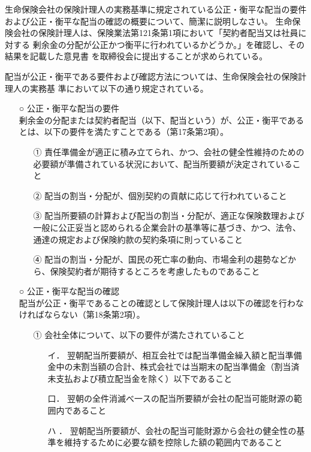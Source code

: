 \documentclass[report,gutter=10mm,fore-edge=10mm,uplatex,dvipdfmx]{jlreq}
\begin{document}
生命保険会社の保険計理人の実務基準に規定されている公正・衡平な配当の要件および公正・衡平な配当の確認の概要について、簡潔に説明しなさい。
\answer{}
生命保険会社の保険計理人は、保険業法第121条第1項において「契約者配当又は社員に対する
剰余金の分配が公正かつ衡平に行われているかどうか。」を確認し、その結果を記載した意見書
を取締役会に提出することが求められている。

配当が公正・衡平である要件および確認方法については、生命保険会社の保険計理人の実務基
準において以下の通り規定されている。

\begin{itemize}
\item[○] 公正・衡平な配当の要件\\
剰余金の分配または契約者配当（以下、配当という）が、公正・衡平であるとは、以下の要件を満たすことである（第17条第2項）。
\begin{itemize}
\item[①] 責任準備金が適正に積み立てられ、かつ、会社の健全性維持のための必要額が準備されている状況において、配当所要額が決定されていること
\item[②] 配当の割当・分配が、個別契約の貢献に応じて行われていること
\item[③] 配当所要額の計算および配当の割当・分配が、適正な保険数理および一般に公正妥当と認められる企業会計の基準等に基づき、かつ、法令、通達の規定および保険約款の契約条項に則っていること
\item[④] 配当の割当・分配が、国民の死亡率の動向、市場金利の趨勢などから、保険契約者が期待するところを考慮したものであること
\end{itemize}
\item[○] 公正・衡平な配当の確認\\
配当が公正・衡平であることの確認として保険計理人は以下の確認を行わなければならない（第18条第2項）。
\begin{itemize}
\item[①] 会社全体について、以下の要件が満たされていること
\begin{itemize}
\item[イ．] 翌朝配当所要額が、相互会社では配当準備金繰入額と配当準備金中の未割当額の合計、株式会社では当期末の配当準備金（割当済未支払および積立配当金を除く）以下であること
\item[口．] 翌朝の全件消滅べ一スの配当所要額が会社の配当可能財源の範囲内であること
\item[ハ ．] 翌朝配当所要額が、会社の配当可能財源から会社の健全性の基準を維持するために必要な額を控除した額の範囲内であること

\end{itemize}
\end{itemize}
\end{itemize}
\end{document}

